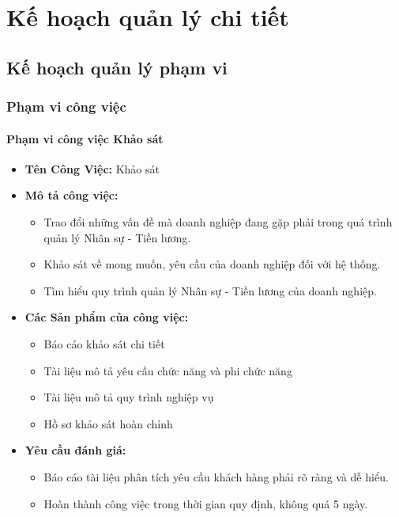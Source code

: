 \chapter{Kế hoạch quản lý chi tiết}
\section{Kế hoạch quản lý phạm vi}
\subsection{Phạm vi công việc}
\subsubsection{Phạm vi công việc Khảo sát}
\begin{itemize}
    \item \textbf{Tên Công Việc:} Khảo sát
    \item \textbf{Mô tả công việc:}
    \begin{itemize}
        \item Trao đổi những vấn đề mà doanh nghiệp đang gặp phải trong quá trình quản lý Nhân sự - Tiền lương.
        \item Khảo sát về mong muốn, yêu cầu của doanh nghiệp đối với hệ thống.
        \item Tìm hiểu quy trình quản lý Nhân sự - Tiền lương của doanh nghiệp.
    \end{itemize}
    \item \textbf{Các Sản phẩm của công việc:}
    \begin{itemize}
        \item Báo cáo khảo sát chi tiết
        \item Tài liệu mô tả yêu cầu chức năng và phi chức năng
        \item Tài liệu mô tả quy trình nghiệp vụ
        \item Hồ sơ khảo sát hoàn chỉnh
    \end{itemize}
    \item \textbf{Yêu cầu đánh giá:}
    \begin{itemize}
        \item Báo cáo tài liệu phân tích yêu cầu khách hàng phải rõ ràng và dễ hiểu.
        \item Hoàn thành công việc trong thời gian quy định, không quá 5 ngày.
    \end{itemize}
\end{itemize}

